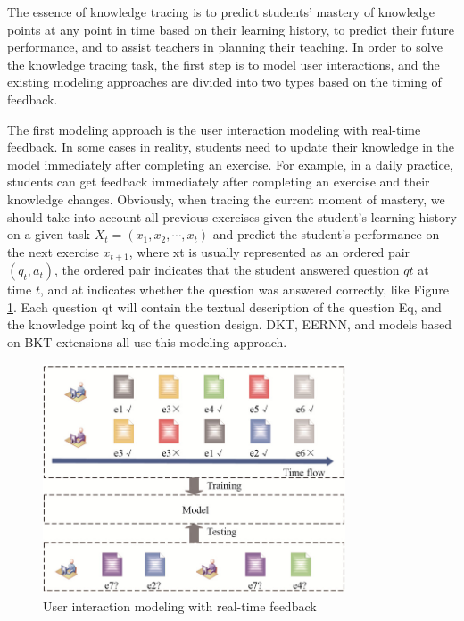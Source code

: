 \documentclass[11pt,en]{elegantpaper}
\begin{document}
The essence of knowledge tracing is to predict students' mastery of knowledge points at any point in time based on their learning history, to predict their future performance, and to assist teachers in planning their teaching. In order to solve the knowledge tracing task, the first step is to model user interactions, and the existing modeling approaches are divided into two types based on the timing of feedback.

The first modeling approach is the user interaction modeling with real-time feedback. In some cases in reality, students need to update their knowledge in the model immediately after completing an exercise. For example, in a daily practice, students can get feedback immediately after completing an exercise and their knowledge changes. Obviously, when tracing the current moment of mastery, we should take into account all previous exercises given the student's learning history on a given task $X_t=(x_1,x_2,⋯,x_t)$ and predict the student's performance on the next exercise $x_{t+1}$, where xt is usually represented as an ordered pair $(q_t,a_t)$, the ordered pair indicates that the student answered question $qt$ at time $t$, and at indicates whether the question was answered correctly, like Figure \ref{kt1}. Each question qt will contain the textual description of the question Eq, and the knowledge point kq of the question design. DKT, EERNN, and models based on BKT extensions all use this modeling approach.

\begin{figure}[h]
	\centering
	\includegraphics[width=0.8\textwidth]{./image/kt1.png}
	\caption{User interaction modeling with real-time feedback}
	\label{kt1}
\end{figure}
\end{document}
